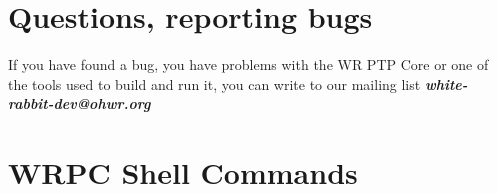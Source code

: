 \documentclass[a4paper, 12pt]{article}
\renewcommand{\_}{\underscore\allowbreak}
\begin{document}
\section{Questions, reporting bugs}
\label{Questions}

If you have found a bug, you have problems with the WR PTP Core or one of the
tools used to build and run it, you can write to our mailing list
\textbf{\textit{white-rabbit-dev@ohwr.org}}




\appendix
\clearpage
\section{WRPC Shell Commands}
\label{WRPC Shell commands}
\end{document}
